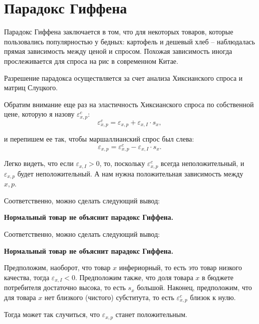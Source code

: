 \documentclass{beamer}
\begin{document}
\section{Парадокс Гиффена}

\begin{frame}

Парадокс Гиффена заключается в том, что для некоторых товаров, которые пользовались популярностью у бедных: картофель и дешевый хлеб – наблюдалась прямая зависимость между ценой и спросом. Похожая зависимость иногда прослеживается для спроса на рис в современном Китае.

Разрешение парадокса осуществляется за счет анализа Хиксианского спроса и матриц Слуцкого. 

\end{frame}

\begin{frame}

Обратим внимание еще раз на эластичность Хиксианского спроса по собственной цене, которую я назову $\varepsilon^c_{x,p}$:
$$\varepsilon^c_{x,p} = \varepsilon_{x,p} + \varepsilon_{x,I} \cdot s_{x},$$

и перепишем ее так, чтобы маршаллианский спрос был слева:
$$\varepsilon_{x,p} = \varepsilon^c_{x,p} - \varepsilon_{x,I} \cdot s_{x}.$$

Легко видеть, что если $\varepsilon_{x,I} > 0$, то, поскольку $\varepsilon^c_{x,p}$ всегда неположительный, и $\varepsilon_{x,p}$ будет неположительный. А нам нужна положительная зависимость между $x,p$. 
\end{frame}

\begin{frame}

Соответственно, можно сделать следующий вывод:

\textbf{Нормальный товар не объяснит парадокс Гиффена.}

\end{frame}

\begin{frame}

Соответственно, можно сделать следующий вывод:

\textbf{Нормальный товар не объяснит парадокс Гиффена.}

\end{frame}

\begin{frame}
Предположим, наоборот, что товар $x$ инфериорный, то есть это товар низкого качества, тогда $\varepsilon_{x,I} < 0$. Предположим также, что доля товара $x$ в бюджете потребителя достаточно высока, то есть $s_{x}$ большой. Наконец, предположим, что для товара $x$ нет близкого (чистого) субститута, то есть $\varepsilon^c_{x,p}$ близок к нулю.

Тогда может так случиться, что $\varepsilon_{x,p}$ станет положительным.

\end{frame}
\end{document}
